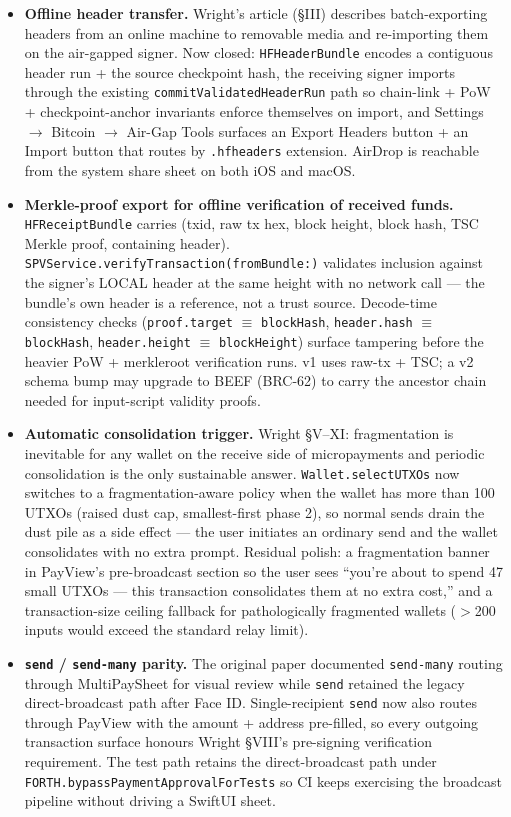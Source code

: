 \documentclass[a4paper, 11pt]{article}
\begin{document}
\begin{itemize}
\item \textbf{Offline header transfer.} Wright's article (\S III) describes batch-exporting headers from an online machine to removable media and re-importing them on the air-gapped signer. Now closed: \texttt{HFHeaderBundle} encodes a contiguous header run + the source checkpoint hash, the receiving signer imports through the existing \texttt{commitValidatedHeaderRun} path so chain-link + PoW + checkpoint-anchor invariants enforce themselves on import, and Settings $\rightarrow$ Bitcoin $\rightarrow$ Air-Gap Tools surfaces an Export Headers button + an Import button that routes by \texttt{.hfheaders} extension. AirDrop is reachable from the system share sheet on both iOS and macOS.
\item \textbf{Merkle-proof export for offline verification of received funds.} \texttt{HFReceiptBundle} carries (txid, raw tx hex, block height, block hash, TSC Merkle proof, containing header). \texttt{SPVService.verifyTransaction(fromBundle:)} validates inclusion against the signer's LOCAL header at the same height with no network call --- the bundle's own header is a reference, not a trust source. Decode-time consistency checks (\texttt{proof.target} $\equiv$ \texttt{blockHash}, \texttt{header.hash} $\equiv$ \texttt{blockHash}, \texttt{header.height} $\equiv$ \texttt{blockHeight}) surface tampering before the heavier PoW + merkleroot verification runs. v1 uses raw-tx + TSC; a v2 schema bump may upgrade to BEEF (BRC-62) to carry the ancestor chain needed for input-script validity proofs.
\item \textbf{Automatic consolidation trigger.} Wright \S V--XI: fragmentation is inevitable for any wallet on the receive side of micropayments and periodic consolidation is the only sustainable answer. \texttt{Wallet.selectUTXOs} now switches to a fragmentation-aware policy when the wallet has more than 100 UTXOs (raised dust cap, smallest-first phase 2), so normal sends drain the dust pile as a side effect --- the user initiates an ordinary send and the wallet consolidates with no extra prompt. Residual polish: a fragmentation banner in PayView's pre-broadcast section so the user sees ``you're about to spend 47 small UTXOs --- this transaction consolidates them at no extra cost,'' and a transaction-size ceiling fallback for pathologically fragmented wallets ($>$200 inputs would exceed the standard relay limit).
\item \textbf{\texttt{send} / \texttt{send-many} parity.} The original paper documented \texttt{send-many} routing through MultiPaySheet for visual review while \texttt{send} retained the legacy direct-broadcast path after Face ID. Single-recipient \texttt{send} now also routes through PayView with the amount + address pre-filled, so every outgoing transaction surface honours Wright \S VIII's pre-signing verification requirement. The test path retains the direct-broadcast path under \texttt{FORTH.bypassPaymentApprovalForTests} so CI keeps exercising the broadcast pipeline without driving a SwiftUI sheet.

\end{itemize}
\end{document}
